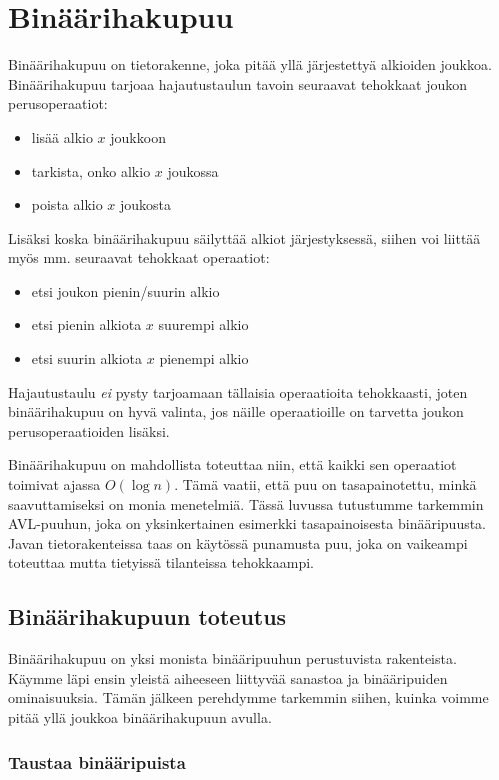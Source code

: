 \chapter{Binäärihakupuu}

Binäärihakupuu on tietorakenne, joka pitää yllä järjestettyä
alkioiden joukkoa. Binäärihakupuu tarjoaa hajautustaulun tavoin
seuraavat tehokkaat joukon perusoperaatiot:

\begin{itemize}
\item lisää alkio $x$ joukkoon
\item tarkista, onko alkio $x$ joukossa
\item poista alkio $x$ joukosta
\end{itemize}

Lisäksi koska binäärihakupuu säilyttää alkiot järjestyksessä,
siihen voi liittää myös mm. seuraavat tehokkaat operaatiot:

\begin{itemize}
\item etsi joukon pienin/suurin alkio
\item etsi pienin alkiota $x$ suurempi alkio
\item etsi suurin alkiota $x$ pienempi alkio
\end{itemize}

Hajautustaulu \emph{ei} pysty tarjoamaan tällaisia operaatioita
tehokkaasti, joten binäärihakupuu on hyvä valinta, jos näille
operaatioille on tarvetta joukon perusoperaatioiden lisäksi.

Binäärihakupuu on mahdollista toteuttaa niin,
että kaikki sen operaatiot toimivat ajassa $O(\log n)$.
Tämä vaatii, että puu on tasapainotettu, minkä saavuttamiseksi
on monia menetelmiä.
Tässä luvussa tutustumme tarkemmin AVL-puuhun, joka on
yksinkertainen esimerkki tasapainoisesta binääripuusta.
Javan tietorakenteissa taas on käytössä punamusta puu,
joka on vaikeampi toteuttaa mutta tietyissä tilanteissa tehokkaampi.

\section{Binäärihakupuun toteutus}

Binäärihakupuu on yksi monista binääripuuhun perustuvista
rakenteista.
Käymme läpi ensin yleistä aiheeseen liittyvää sanastoa
ja binääripuiden ominaisuuksia.
Tämän jälkeen perehdymme tarkemmin siihen,
kuinka voimme pitää yllä joukkoa binäärihakupuun avulla.

\subsection{Taustaa binääripuista}

